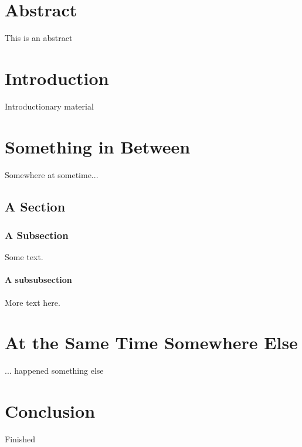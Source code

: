 \documentclass{ituthesis}
\begin{document}

\frontmatter

\thetitlepage
\newpage

\chapter*{Abstract}
This is an abstract

\cleardoublepage
\setcounter{tocdepth}{1}
\tableofcontents

\mainmatter

\midsloppy
\sloppybottom

\chapter{Introduction}
Introductionary material

\chapter{Something in Between}
Somewhere at sometime...

\section{A Section}
\subsection{A Subsection}
Some text.
\subsubsection{A subsubsection}
More text here.

\chapter{At the Same Time Somewhere Else}
... happened something else

\chapter{Conclusion}
Finished
\end{document}

